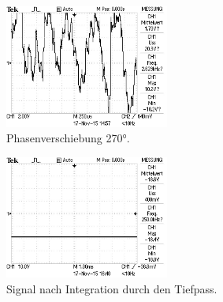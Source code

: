  \begin{figure}
   \centering
   \includegraphics[width=0.48\textwidth]{bilder/Mit Rauschen/5.JPG}
 \caption{Phasenverschiebung 270°.}
   \label{fig:5}
 \end{figure}

 \begin{figure}
   \centering
   \includegraphics[width=0.48\textwidth]{bilder/Mit Rauschen/6.JPG}
 \caption{Signal nach Integration durch den Tiefpass.}
   \label{fig:6}
 \end{figure}

